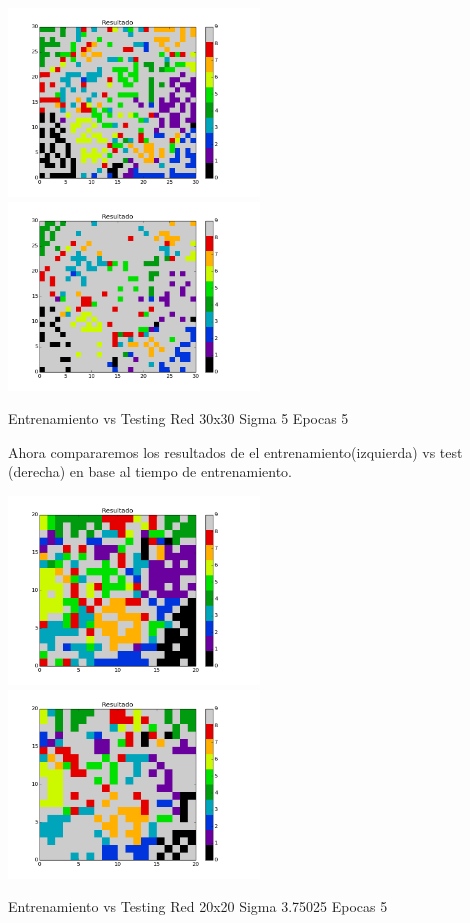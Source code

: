 \includegraphics[width=0.5\textwidth]{img/EJ2_Sigma/train_M_30_sigma_5_0_epocas_5}
\includegraphics[width=0.5\textwidth]{img/EJ2_Sigma/test_M_30_sigma_5_0_epocas_5}
{\center \footnotesize Entrenamiento vs Testing Red 30x30 Sigma 5 Epocas 5\par}

Ahora compararemos los resultados de el entrenamiento(izquierda) vs test (derecha) en base al tiempo de entrenamiento.

\includegraphics[width=0.5\textwidth]{img/Ej2_Epocas/train_M_20_sigma_3_75025_epocas_5}
\includegraphics[width=0.5\textwidth]{img/Ej2_Epocas/test_M_20_sigma_3_75025_epocas_5}
{\center \footnotesize Entrenamiento vs Testing Red 20x20 Sigma 3.75025 Epocas 5\par}

